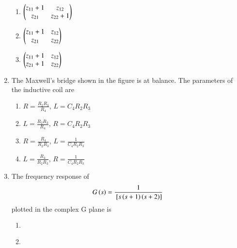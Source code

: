 \documentclass[journal]{IEEEtran}
\begin{document}
\begin{enumerate}
\begin{enumerate}
    \item $\begin{pmatrix}z_{11}+1 & z_{12} \\ z_{21} & z_{22}+1\end{pmatrix}$
    \item $\begin{pmatrix}z_{11}+1 & z_{12} \\ z_{21} & z_{22}\end{pmatrix}$
    \item $\begin{pmatrix}z_{11}+1 & z_{12} \\ z_{21}+1 & z_{22}\end{pmatrix}$ \\
 \end{enumerate}
\item The Maxwell's bridge shown in the figure is at balance. The parameters of the inductive coil are 
\begin{figure}[!ht]
\centering
\resizebox{0.5\textwidth}{!}{%

}%
\end{figure}
\begin{enumerate}
     \item $R = \frac{R_2R_3}{R_4}$, $L = C_4R_2R_3$
     \item $L = \frac{R_2R_3}{R_4}$, $R = C_4R_2R_3$
     \item $R = \frac{R_4}{R_2R_3}$, $L = \frac{1}{C_4R_2R_3}$
     \item $L = \frac{R_4}{R_2R_3}$, $R = \frac{1}{C_4R_2R_3}$ \\
 \end{enumerate}
\item The frequency response of 
\begin{align*}
 G\left(s\right) = \frac{1}{{}\left[s\left(s+1\right)\left(s+2\right)\right]}   
\end{align*}
plotted in the complex G plane  is
\begin{enumerate}
    \item 
    \begin{figure}[!ht]
%
\end{figure}
    \item 

\end{enumerate}
\end{enumerate}
\end{document}
